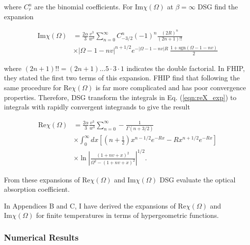 where $C^n_r$ are the binomial coefficients. For $\text{Im}\chi(\Omega)$ at $\beta = \infty$ DSG find the expansion

\begin{equation}
    \begin{split}
        \textrm{Im}\chi(\Omega) &= \frac{2\alpha}{3} \frac{v^3}{w^3} \sum_{n=0}^\infty C^n_{-3/2} (-1)^n \frac{(2R)^n}{(2n + 1)!!} \\
        &\times |\Omega -1 - nv|^{n + 1/2} e^{-|\Omega - 1 -nv|R}\ \frac{1 + \textrm{sgn}(\Omega - 1 - nv)}{2}
    \end{split}
\end{equation}

where $(2n + 1)!! = (2n + 1) \dots 5 \cdot 3 \cdot 1$ indicates the double factorial. In FHIP, they stated the first two terms of this expansion. FHIP find that following the same procedure for $\text{Re}\chi(\Omega)$ is far more complicated and has poor convergence properties. Therefore, DSG transform the integrals in Eq. (\ref{eqn:reX_exp}) to integrals with rapidly convergent integrands to give the result

\begin{equation}
    \begin{split}
    \textrm{Re}\chi(\Omega) &= \frac{2\alpha}{3} \frac{v^3}{w^3} \sum_{n=0}^\infty -\frac{1}{\Gamma(n + 3/2)} \\
    &\times\int_0^\infty dx \left[ \left(n + \frac{1}{2}\right) x^{n-1/2} e^{-Rx} - R x^{n + 1/2} e^{-Rx} \right] \\
    &\times \ln{\left| \frac{(1 + nv + x)^2}{\Omega^2 - (1 + nv + x)^2} \right|^{1/2}}.
    \end{split}
\end{equation}

From these expansions of $\text{Re}\chi(\Omega)$ and $\text{Im}\chi(\Omega)$ DSG evaluate the optical absorption coefficient. 

In Appendices B and C, I have derived the expansions of $\text{Re}\chi(\Omega)$ and $\text{Im}\chi(\Omega)$ for finite temperatures in terms of hypergeometric functions.

\subsubsection{Numerical Results}

